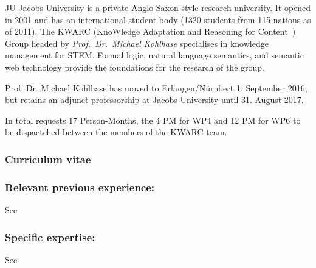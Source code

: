 \begin{sitedescription}{JU}
  Jacobs University is a private Anglo-Saxon style research university.  It opened in 2001
  and has an international student body (1320 students from 115 nations as of 2011).  The
  KWARC (KnoWledge Adaptation and Reasoning for Content~\cite{KWARC:online}) Group headed
  by {\emph{Prof.\ Dr.\ Michael Kohlhase}} specialises in knowledge management for STEM.
  Formal logic, natural language semantics, and semantic web technology provide the
  foundations for the research of the group.
  
  Prof. Dr. Michael Kohlhase has moved to  Erlangen/N\"urnbert 1. September
  2016, but retains an adjunct professorship at Jacobs University until 31. August 2017.  

  In total  requests 17 Person-Months, the 4 PM for WP4 and 12 PM for WP6 to be dispactched between the members of the KWARC team.

\subsubsection*{Curriculum vitae}





\subsubsection*{Relevant previous experience:}
See 

\subsubsection*{Specific expertise:}
See 
\end{sitedescription}


